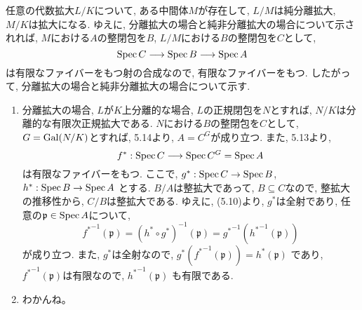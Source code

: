 \documentclass[dvipdfmx]{jsarticle}
\begin{document}
    \begin{problem}
        任意の代数拡大$L/K$について,
        ある中間体$M$が存在して,
        $L/M$は純分離拡大, $M/K$は拡大になる.
        ゆえに, 分離拡大の場合と純非分離拡大の場合について示されれば,
        $M$における$A$の整閉包を$B$, $L/M$における$B$の整閉包を$C$として,
        \[
            \operatorname{Spec}{C} \longrightarrow \operatorname{Spec}{B} \longrightarrow \operatorname{Spec}{A}
        \]
        は有限なファイバーをもつ射の合成なので, 有限なファイバーをもつ.
        したがって, 分離拡大の場合と純非分離拡大の場合について示す.

        \begin{enumerate}
            \item 分離拡大の場合,
            \color{red}
            $L$が$K$上分離的な場合, $L$の正規閉包を$N$とすれば,
            $N/K$は分離的な有限次正規拡大である.
            \color{black}
            $N$における$B$の整閉包を$C$として, $G = \operatorname{Gal}(N/K)$とすれば,
            5.14より, $A = C^G$が成り立つ.
            また, 5.13より,
            \[
                f^\ast: \operatorname{Spec}{C} \longrightarrow \operatorname{Spec}{C^G} = \operatorname{Spec}{A}
            \]
            は有限なファイバーをもつ.
            ここで, $g^\ast: \operatorname{Spec}{C} \to \operatorname{Spec}{B}$, $h^\ast: \operatorname{Spec}{B} \to \operatorname{Spec}{A}$
            とする.
            $B/A$は整拡大であって, $B \subseteq C$なので, 整拡大の推移性から,
            $C/B$は整拡大である.
            ゆえに,
            (5.10)より, $g^\ast$は全射であり,
            任意の$\mathfrak{p} \in \operatorname{Spec}{A}$について,
            \[
                {f^{\ast}}^{-1}(\mathfrak{p}) = (h^\ast \circ g^\ast)^{-1}(\mathfrak{p}) = {g^\ast}^{-1}({h^\ast}^{-1}(\mathfrak{p}))
            \]
            が成り立つ.
            また, $g^\ast$は全射なので, $g^\ast({f^\ast}^{-1}(\mathfrak{p})) = h^\ast(\mathfrak{p})$
            であり, ${f^\ast}^{-1}(\mathfrak{p})$は有限なので, ${h^\ast}^{-1}(\mathfrak{p})$
            も有限である.
            \item
            \color{red}
            わかんね。
            \color{black}
        \end{enumerate}
    \end{problem}
\end{document}
